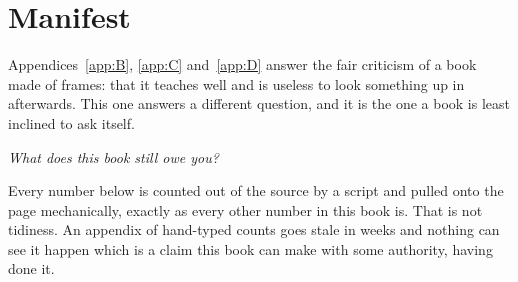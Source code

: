 %
%
%
%
%
%

\chapter{Manifest}
\label{app:F}

\noindent
Appendices~\ref{app:B}, \ref{app:C} and~\ref{app:D} answer the fair criticism
of a book made of frames: that it teaches well and is useless to look
something up in afterwards. This one answers a different question, and it is
the one a book is least inclined to ask itself.

\emph{What does this book still owe you?}

Every number below is counted out of the source by a script and pulled onto
the page mechanically, exactly as every other number in this book is. That is
not tidiness. An appendix of hand-typed counts goes stale in weeks and nothing
can see it happen \dash{} which is a claim this book can make with some
authority, having done it.

